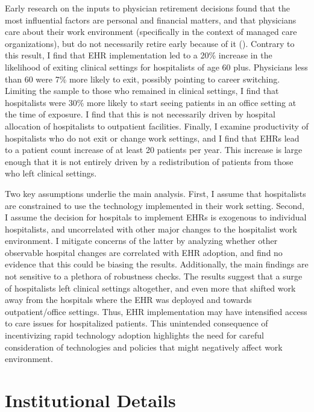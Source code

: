 \documentclass[12pt]{article}
\begin{document}
Early research on the inputs to physician retirement decisions found that the most influential factors are personal and financial matters, and that physicians care about their work environment (specifically in the context of managed care organizations), but do not necessarily retire early because of it (\cite{Bahrami2002}). Contrary to this result, I find that EHR implementation led to a 20\% increase in the likelihood of exiting clinical settings for hospitalists of age 60 plus. Physicians less than 60 were 7\% more likely to exit, possibly pointing to career switching. Limiting the sample to those who remained in clinical settings, I find that hospitalists were 30\% more likely to start seeing patients in an office setting at the time of exposure. I find that this is not necessarily driven by hospital allocation of hospitalists to outpatient facilities. Finally, I examine productivity of hospitalists who do not exit or change work settings, and I find that EHRs lead to a patient count increase of at least 20 patients per year. This increase is large enough that it is not entirely driven by a redistribution of patients from those who left clinical settings. 

Two key assumptions underlie the main analysis. First, I assume that hospitalists are constrained to use the technology implemented in their work setting. Second, I assume the decision for hospitals to implement EHRs is exogenous to individual hospitalists, and uncorrelated with other major changes to the hospitalist work environment. I mitigate concerns of the latter by analyzing whether other observable hospital changes are correlated with EHR adoption, and find no evidence that this could be biasing the results. Additionally, the main findings are not sensitive to a plethora of robustness checks. The results suggest that a surge of hospitalists left clinical settings altogether, and even more that shifted work away from the hospitals where the EHR was deployed and towards outpatient/office settings. Thus, EHR implementation may have intensified access to care issues for hospitalized patients. This unintended consequence of incentivizing rapid technology adoption highlights the need for careful consideration of technologies and policies that might negatively affect work environment. 




\section{Institutional Details}
\end{document}
